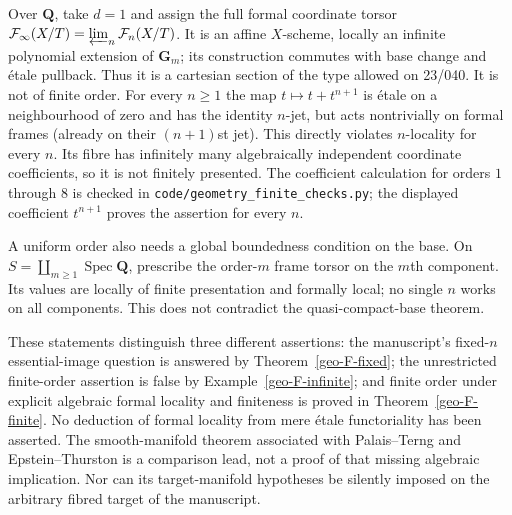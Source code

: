 \begin{example}
\label{geo-F-infinite}
Over $\mathbf Q$, take $d=1$ and assign the full formal coordinate torsor
$\mathcal F_\infty(X/T)=\varprojlim_n\mathcal F_n(X/T)$. It is an affine
$X$-scheme, locally an infinite polynomial extension of $\mathbf G_m$;
its construction commutes with base change and \'{e}tale pullback. Thus it
is a cartesian section of the type allowed on 23/040. It is not of finite
order. For every $n\geq1$ the map $t\mapsto t+t^{n+1}$ is \'{e}tale on
a neighbourhood of zero and has the identity $n$-jet, but acts nontrivially
on formal frames (already on their $(n+1)$st jet). This directly violates
$n$-locality for every $n$. Its fibre has infinitely many algebraically
independent coordinate coefficients, so it is not finitely presented.
The coefficient calculation for orders $1$ through $8$ is checked in
\texttt{code/geometry\_finite\_checks.py}; the displayed coefficient
$t^{n+1}$ proves the assertion for every $n$.

A uniform order also needs a global boundedness condition on the base. On
$S=\coprod_{m\geq1}\operatorname{Spec}\mathbf Q$, prescribe the order-$m$
frame torsor on the $m$th component. Its values are locally of finite
presentation and formally local; no single $n$ works on all components.
This does not contradict the quasi-compact-base theorem.
\end{example}

These statements distinguish three different assertions: the manuscript's
fixed-$n$ essential-image question is answered by
Theorem~\ref{geo-F-fixed}; the unrestricted finite-order assertion is false
by Example~\ref{geo-F-infinite}; and finite order under explicit algebraic
formal locality and finiteness is proved in Theorem~\ref{geo-F-finite}.
No deduction of formal locality from mere \'{e}tale functoriality has been
asserted. The smooth-manifold theorem associated with Palais--Terng and
Epstein--Thurston is a comparison lead, not a proof of that missing algebraic
implication. Nor can its target-manifold hypotheses be silently imposed on
the arbitrary fibred target of the manuscript.
